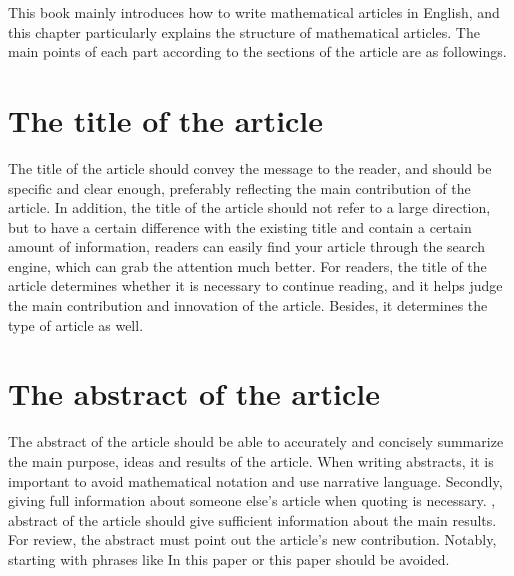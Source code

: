 

This book mainly introduces how to write mathematical articles in English, and this chapter particularly explains the structure of mathematical articles. The main points of each part according to the sections of the article are as followings.

\section{The title of the article}
The title of the article should convey the message to the reader, and should be specific and clear enough, preferably reflecting the main contribution of the article. In addition, the title of the article should not refer to a large direction, but to have a certain difference with the existing title and contain a certain amount of information,  readers can easily find your article through the search engine, which can grab the  attention much better. For readers, the title of the article determines whether it is necessary to continue reading, and it helps judge the main contribution and innovation of the article. Besides, it determines the type of article as well.

\section{The abstract of the article}
The abstract of the article should be able to accurately and concisely summarize the main purpose, ideas and results of the article. When writing abstracts, it is important to avoid mathematical notation and use narrative language. Secondly, giving full information about someone else's article when quoting  is necessary. , abstract of the article should give sufficient information about the main results. For review, the abstract must point out the article's new contribution. Notably, starting with phrases like In this paper or this paper should be avoided.

